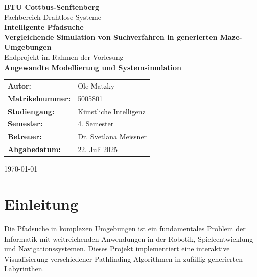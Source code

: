 \documentclass[12pt,a4paper]{article}
\begin{document}
\begin{titlepage}
    \centering
    \vspace*{2cm}
    
    {\LARGE\textbf{BTU Cottbus-Senftenberg}}\\[0.5cm]
    {\Large Fachbereich Drahtlose Systeme}\\[2cm]
    
    {\huge\textbf{Intelligente Pfadsuche}}\\[0.5cm]
    {\LARGE\textbf{Vergleichende Simulation von Suchverfahren in generierten Maze-Umgebungen}}\\[3cm]
    
    {\Large Endprojekt im Rahmen der Vorlesung}\\[0.3cm]
    {\Large\textbf{Angewandte Modellierung und Systemsimulation}}\\[2cm]
    
    \begin{tabular}{ll}
        \textbf{Autor:} & Ole Matzky\\[0.3cm]
        \textbf{Matrikelnummer:} & 5005801 \\[0.3cm]
        \textbf{Studiengang:} & Künstliche Intelligenz \\[0.3cm]
        \textbf{Semester:} & 4. Semester \\[0.3cm]
        \textbf{Betreuer:} & Dr. Svetlana Meissner \\[0.3cm]
        \textbf{Abgabedatum:} & 22. Juli 2025 \\
    \end{tabular}
    
    \vfill
    
    {\large\today}
\end{titlepage}

\tableofcontents
\newpage

\section{Einleitung}

Die Pfadsuche in komplexen Umgebungen ist ein fundamentales Problem der Informatik mit weitreichenden Anwendungen in der Robotik, Spieleentwicklung und Navigationssystemen. Dieses Projekt implementiert eine interaktive Visualisierung verschiedener Pathfinding-Algorithmen in zufällig generierten Labyrinthen.
\end{document}
